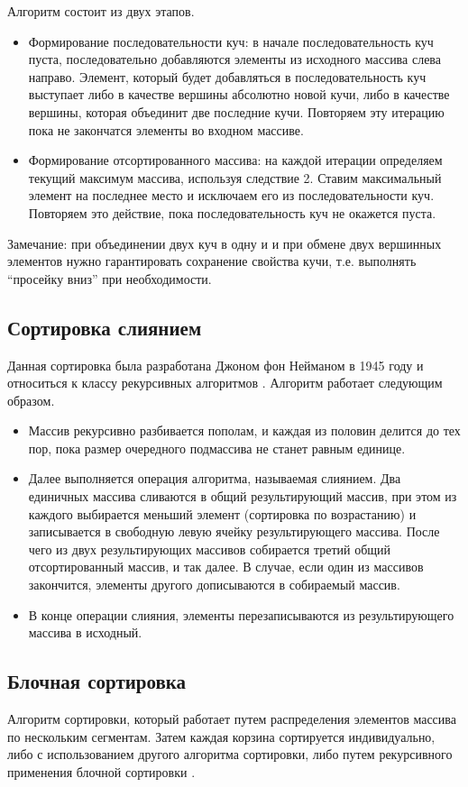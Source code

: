 Алгоритм состоит из двух этапов.
\begin{itemize}
\item Формирование последовательности куч:
в начале последовательность куч пуста, последовательно добавляются элементы из исходного массива слева направо. Элемент, который будет добавляться в последовательность куч выступает либо в качестве вершины абсолютно новой кучи, либо в качестве вершины, которая объединит две последние кучи. Повторяем эту итерацию пока не закончатся элементы во входном массиве.
\item Формирование отсортированного массива:
на каждой итерации определяем текущий максимум массива, используя следствие 2. Ставим максимальный элемент на последнее место и исключаем его из последовательности куч. Повторяем это действие, пока последовательность куч не окажется пуста.
\end{itemize}

Замечание:
при объединении двух куч в одну и и при обмене двух вершинных элементов нужно гарантировать сохранение свойства кучи, т.е. выполнять “просейку вниз” при необходимости.
\subsection{Сортировка слиянием}
Данная сортировка была разработана Джоном фон Нейманом в 1945 году и относиться к классу рекурсивных алгоритмов \cite{algos}. 
Алгоритм работает следующим образом.
\begin{itemize}
\item Массив рекурсивно разбивается пополам, и каждая из половин делится до тех пор, пока размер очередного подмассива не станет равным единице.

\item Далее выполняется операция алгоритма, называемая слиянием. Два единичных массива сливаются в общий результирующий массив, при этом из каждого выбирается меньший элемент (сортировка по возрастанию) и записывается в свободную левую ячейку результирующего массива. После чего из двух результирующих массивов собирается третий общий отсортированный массив, и так далее. В случае, если один из массивов закончится, элементы другого дописываются в собираемый массив.

\item В конце операции слияния, элементы перезаписываются из результирующего массива в исходный.
\end{itemize}

\subsection {Блочная сортировка}
Алгоритм сортировки, который работает путем распределения элементов массива по нескольким сегментам. Затем каждая корзина сортируется индивидуально, либо с использованием другого алгоритма сортировки, либо путем рекурсивного применения блочной сортировки \cite{algos}.

